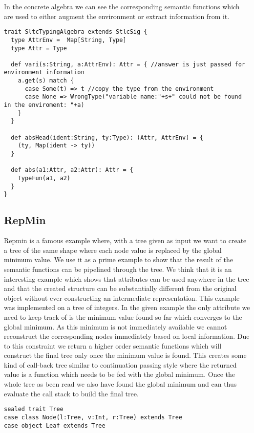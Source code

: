 In the concrete algebra we can see the corresponding semantic functions which are used to either augment the environment or extract information from it.

\begin{lstlisting}
trait SltcTypingAlgebra extends StlcSig {
  type AttrEnv =  Map[String, Type]
  type Attr = Type

  def vari(s:String, a:AttrEnv): Attr = { //answer is just passed for environment information
    a.get(s) match {
      case Some(t) => t //copy the type from the environment
      case None => WrongType("variable name:"+s+" could not be found in the enviroment: "+a)
    }
  }

  def absHead(ident:String, ty:Type): (Attr, AttrEnv) = {
    (ty, Map(ident -> ty))
  }

  def abs(a1:Attr, a2:Attr): Attr = {
    TypeFun(a1, a2)
  }
}
\end{lstlisting}

\subsection{RepMin}
Repmin is a famous example where, with a tree given as input we want to create a tree of the same shape where each node value is replaced by the global minimum value. 
We use it as a prime example to show that the result of the semantic functions can be pipelined through the tree. We think that it is an interesting example which shows that attributes can be used anywhere in the tree and that the created structure can be substantially different from the original object without ever constructing an intermediate representation.
This example was implemented on a tree of integers. In the given example the only attribute we need to keep track of is the minimum value found so far which converges to the global minimum. As this minimum is not immediately available we cannot reconstruct the corresponding nodes immediately based on local information. Due to this constraint we return a higher order semantic functions which will construct the final tree only once the minimum value is found. This creates some kind of call-back tree similar to continuation passing style where the  returned value is a function which needs to be fed with the global minimum. Once the whole tree as been read we also have found the global minimum and can thus evaluate the call stack to build the final tree.

\begin{lstlisting}
sealed trait Tree
case class Node(l:Tree, v:Int, r:Tree) extends Tree
case object Leaf extends Tree
\end{lstlisting}

